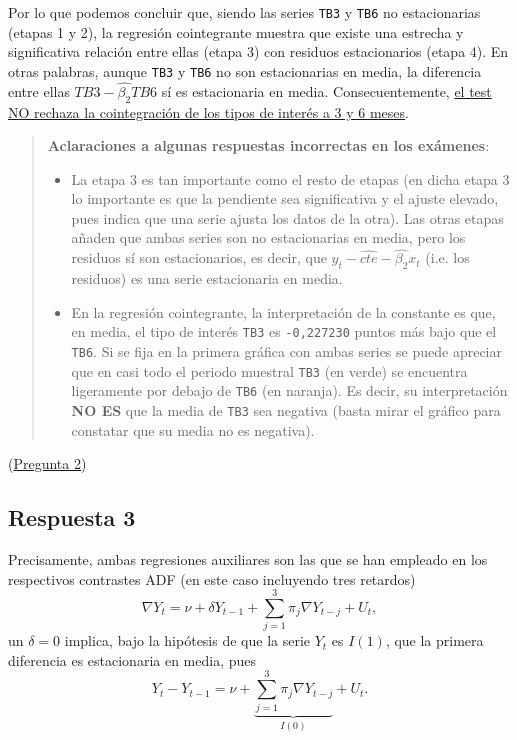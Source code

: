 \documentclass[10pt]{article}
\begin{document}
Por lo que podemos concluir que, siendo las series \texttt{TB3} y \texttt{TB6} no
estacionarias (etapas 1 y 2), la regresión cointegrante muestra que
existe una estrecha y significativa relación entre ellas (etapa 3) con
residuos estacionarios (etapa 4). En otras palabras, aunque \texttt{TB3} y
\texttt{TB6} no son estacionarias en media, la diferencia entre ellas
\(TB3-\widehat{\beta_2}TB6\) sí es estacionaria en
media. Consecuentemente, \uline{el test NO rechaza la cointegración de los
tipos de interés a 3 y 6 meses}.

\begin{quote}
\textbf{Aclaraciones a algunas respuestas incorrectas en los exámenes}:

\begin{itemize}
\item La etapa 3 es tan importante como el resto de etapas (en dicha etapa
3 lo importante es que la pendiente sea significativa y el ajuste
elevado, pues indica que una serie ajusta los datos de la otra). Las
otras etapas añaden que ambas series son no estacionarias en media,
pero los residuos sí son estacionarios, es decir, que
\(y_t-\widehat{cte}-\widehat{\beta_2} x_t\) (i.e. los residuos) es una
serie estacionaria en media.
\item En la regresión cointegrante, la interpretación de la constante es
que, en media, el tipo de interés \texttt{TB3} es \texttt{-0,227230} puntos más
bajo que el \texttt{TB6}. Si se fija en la primera gráfica con ambas series
se puede apreciar que en casi todo el periodo muestral \texttt{TB3} (en
verde) se encuentra ligeramente por debajo de \texttt{TB6} (en naranja). Es
decir, su interpretación \textbf{NO ES} que la media de \texttt{TB3} sea negativa
(basta mirar el gráfico para constatar que su media no es negativa).
\end{itemize}
\end{quote}

(\hyperref[sec:org90607d1]{Pregunta 2})
\subsection*{Respuesta 3}
\label{sec:org6956953}

Precisamente, ambas regresiones auxiliares son las que se han empleado
en los respectivos contrastes ADF (en este caso incluyendo tres
retardos) $$\nabla Y_{t} = \nu + \delta Y_{t-1} + \sum_{j=1}^3 \pi_j
\nabla Y_{t-j} + U_t,$$ un \(\delta=0\) implica, bajo la hipótesis de que
la serie \(Y_t\) es \(I(1)\), que la primera diferencia es estacionaria en
media, pues $$Y_{t}-Y_{t-1} = \nu + \underbrace{\sum_{j=1}^3 \pi_j
\nabla Y_{t-j}}_{I(0)} + U_t.$$
\end{document}
